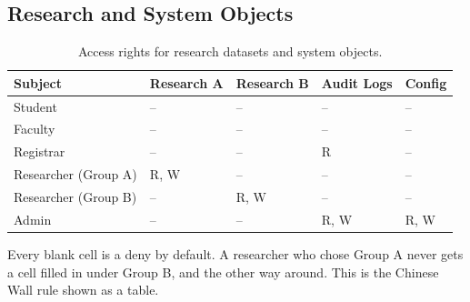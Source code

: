         \subsection[MatrixResearch]{Research and System Objects}

            \begin{table}[h]
                \centering
                \small
                \begin{tabular}{
                    >{\raggedright\arraybackslash}p{2.4cm}
                    >{\centering\arraybackslash}p{1.8cm}
                    >{\centering\arraybackslash}p{1.8cm}
                    >{\centering\arraybackslash}p{1.8cm}
                    >{\centering\arraybackslash}p{1.8cm}
                }
                    \toprule
                    Subject & Research A & Research B & Audit Logs & Config \\
                    \midrule
                    Student & -- & -- & -- & -- \\
                    Faculty & -- & -- & -- & -- \\
                    Registrar & -- & -- & R & -- \\
                    Researcher (Group A) & R, W & -- & -- & -- \\
                    Researcher (Group B) & -- & R, W & -- & -- \\
                    Admin & -- & -- & R, W & R, W \\
                    \bottomrule
                \end{tabular}
                \caption{Access rights for research datasets and system objects.}
                \label{tab:matrix-research}
            \end{table}

            \begin{takeawaybox}
                Every blank cell is a deny by default. A researcher who chose Group A never gets a cell filled
                in under Group B, and the other way around. This is the Chinese Wall rule shown as a table.
            \end{takeawaybox}


